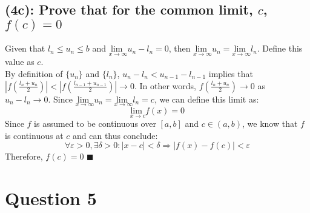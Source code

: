 \documentclass{article}
\newcommand{\lmt}{\underset{x\rightarrow\infty}{\text{lim }}}
\begin{document}
\subsection*{(4c): Prove that for the common limit, $c$, $f(c)=0$}

Given that $l_n\leq u_n\leq b$ and $\lmt u_n-l_n = 0$, then $\lmt u_n = \lmt l_n$. Define this value as $c$. 
\medskip \\
By definition of $\{u_n\}$ and $\{l_n\}$, $u_{n}-l_{n}<u_{n-1}-l_{n-1}$ implies that $|f(\frac{l_n+u_n}{2})|<|f(\frac{l_{n-1}+u_{n-1}}{2})|\rightarrow0$. In other words, $f(\frac{l_n+u_n}{2})\rightarrow 0$ as $u_{n}-l_{n}\rightarrow 0$. Since  $\lmt u_n = \lmt l_n = c$, we can define this limit as:
\[
	\underset{x\rightarrow c}{\text{lim }} f(x) = 0
\]
Since $f$ is assumed to be continuous over $[a,b]$ and $c\in(a,b)$, we know that $f$ is continuous at $c$ and can thus conclude:
\[
	\forall \varepsilon>0,\exists\delta>0:|x-c|<\delta\Rightarrow|f(x)-f(c)|<\varepsilon
\]
Therefore, $f(c)=0$ $\blacksquare$


\section*{Question 5}
\end{document}
